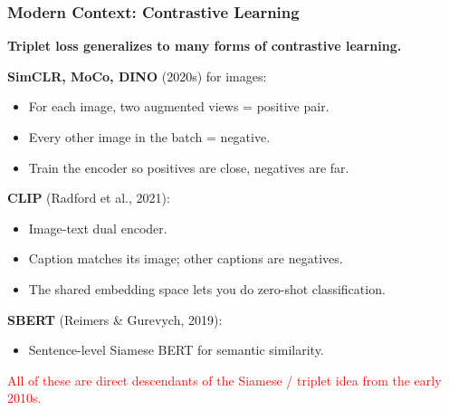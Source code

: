 \documentclass[notes,11pt, aspectratio=169]{beamer}
\begin{document}
\begin{frame}
\frametitle{Modern Context: Contrastive Learning}

\textbf{Triplet loss generalizes to many forms of contrastive learning.}

\vspace{6pt}
\textbf{SimCLR, MoCo, DINO} (2020s) for images:
\begin{itemize}
    \item For each image, two augmented views = positive pair.
    \item Every other image in the batch = negative.
    \item Train the encoder so positives are close, negatives are far.
\end{itemize}

\vspace{8pt}
\textbf{CLIP} (Radford et al., 2021):
\begin{itemize}
    \item Image-text dual encoder.
    \item Caption matches its image; other captions are negatives.
    \item The shared embedding space lets you do zero-shot classification.
\end{itemize}

\vspace{8pt}
\textbf{SBERT} (Reimers \& Gurevych, 2019):
\begin{itemize}
    \item Sentence-level Siamese BERT for semantic similarity.
\end{itemize}

\vspace{4pt}
\textcolor{red}{All of these are direct descendants of the Siamese / triplet idea from the early 2010s.}
\end{frame}
\end{document}
